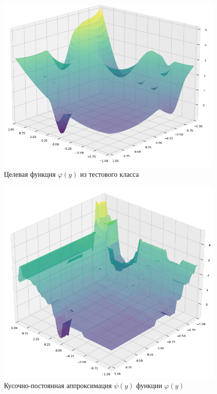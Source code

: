 \documentclass[runningheads]{llncs}
\begin{document}
\begin{figure}
	\begin{center}
		\begin{minipage}[h]{0.7\linewidth}
			\includegraphics[width=1\linewidth]{figure/fig5.png}
			\caption{Целевая функция $\varphi(y)$ из тестового класса} %
			\label{fig:fig2}
		\end{minipage}
	\end{center}
\end{figure}	

\begin{figure}
	\begin{center}
		\begin{minipage}[h]{0.7\linewidth}
			\includegraphics[width=1\linewidth]{figure/fig4.png}
			\caption{Кусочно-постоянная аппроксимация $\psi(y)$ функции $\varphi(y)$} %
			\label{fig:fig2_2}
		\end{minipage}
	\end{center}
\end{figure}	
\end{document}
